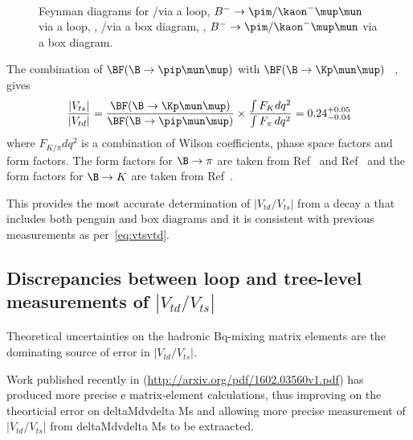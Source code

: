 \begin{figure}[!h]\def\nh{0.5\textwidth}
  \centering
  \hspace*{-1cm}
  \\
  \hspace*{-1cm}
  \caption{Feynman diagrams for \protect{} \Lb\to\proton\pim/\Km\mup\mun via a loop,  \protect{} $B^{-}\to\pim/\kaon^{-}\mup\mun$ via a loop,  \protect{}, \Lb\to\proton\pim/\Km\mup\mun via a box diagram,
   \protect{}, $B^{-}\to\pim/\kaon^{-}\mup\mun$ via a box diagram.
  }
  \label{fig:boxpeng}
\end{figure}
The combination of $\BF(\B\to\pip\mun\mup)$ with $\BF(\B\to\Kp\mun\mup)$ ~\cite{bKmumu},  gives
\begin{equation}
  \frac{|V_{ts}|}{|V_{td}|} = \frac{\BF(\B\to\Kp\mun\mup)}{\BF(\B\to\pip\mun\mup)} \times \frac{\int F_{K}d q^{2}}{\int F_{\pi}\,dq^{2}} = 0.24^{+0.05}_{-0.04}
  \end{equation}
where $F_{K/\pi}d q^{2}$ is a combination of Wilson coefficients, phase space factors and form factors. The form factors for $\B\to\pi$ are taken from Ref~\cite{bpimumuff1} and Ref~\cite{bpimumuff2} and the form factors for $\B\to K$ are taken from Ref~\cite{bKmumuff1}.

This provides the most accurate determination of $|V_{td}/V_{ts}|$ from a decay a that includes both penguin and box diagrams and it is consistent with previous measurements as per~\autoref{eq:vtsvtd}.

\subsection{Discrepancies between loop and tree-level measurements of $|V_{td}/V_{ts}|$}
Theoretical uncertainties on the hadronic Bq-mixing matrix elements are the dominating source of error in $|V_{td}/V_{ts}|$.

Work published recently in (\url{http://arxiv.org/pdf/1602.03560v1.pdf}) has produced more precise e matrix-element calculations, thus improving on the theorticial error on deltaMdvdelta Ms and allowing more precise measurement of $|V_{td}/V_{ts}|$ from deltaMdvdelta Ms to be extraacted.

